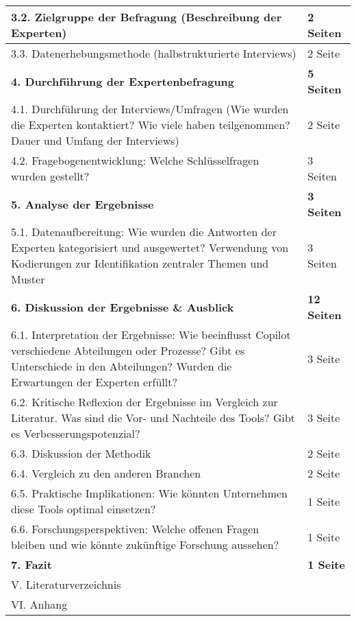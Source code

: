 \begin{longtable}{|p{10cm}|p{2.5cm}|}
        \hline
        3.2. Zielgruppe der Befragung (Beschreibung der Experten) & 2 Seiten \\
        \hline
        3.3. Datenerhebungsmethode (halbstrukturierte Interviews) & 2 Seite \\
    \hline
    \textbf{4. Durchführung der Expertenbefragung} & \textbf{5 Seiten} \\
    \hline
        4.1. Durchführung der Interviews/Umfragen (Wie wurden die Experten kontaktiert? Wie viele haben teilgenommen? Dauer und Umfang der Interviews) & 2 Seite \\
        \hline
        4.2. Fragebogenentwicklung: Welche Schlüsselfragen wurden gestellt?  & 3 Seiten \\
    \hline
    \textbf{5. Analyse der Ergebnisse} & \textbf{3 Seiten} \\
    \hline
        5.1. Datenaufbereitung: Wie wurden die Antworten der Experten kategorisiert und ausgewertet? Verwendung von Kodierungen zur Identifikation zentraler Themen und Muster & 3 Seiten \\

    \hline
    \textbf{6. Diskussion der Ergebnisse \& Ausblick} & \textbf{12 Seiten} \\
    \hline
        6.1. Interpretation der Ergebnisse: Wie beeinflusst Copilot verschiedene Abteilungen oder Prozesse? Gibt es Unterschiede in den Abteilungen? Wurden die Erwartungen der Experten erfüllt? & 3 Seite \\
        \hline
        6.2. Kritische Reflexion der Ergebnisse im Vergleich zur Literatur. Was sind die Vor- und Nachteile des Tools? Gibt es Verbesserungspotenzial? & 3 Seite \\
        \hline
        6.3. Diskussion der Methodik & 2 Seite \\
        \hline
        6.4. Vergleich zu den anderen Branchen & 2 Seite \\
        \hline
        6.5. Praktische Implikationen: Wie könnten Unternehmen diese Tools optimal einsetzen? & 1 Seite \\
        \hline
        6.6. Forschungsperspektiven: Welche offenen Fragen bleiben und wie könnte zukünftige Forschung aussehen? & 1 Seite \\
    \hline
    \textbf{7. Fazit} & \textbf{1 Seite} \\
    \hline
    V. Literaturverzeichnis & \\
    \hline
    VI. Anhang & \\
    \hline
\end{longtable}



\clearpage
